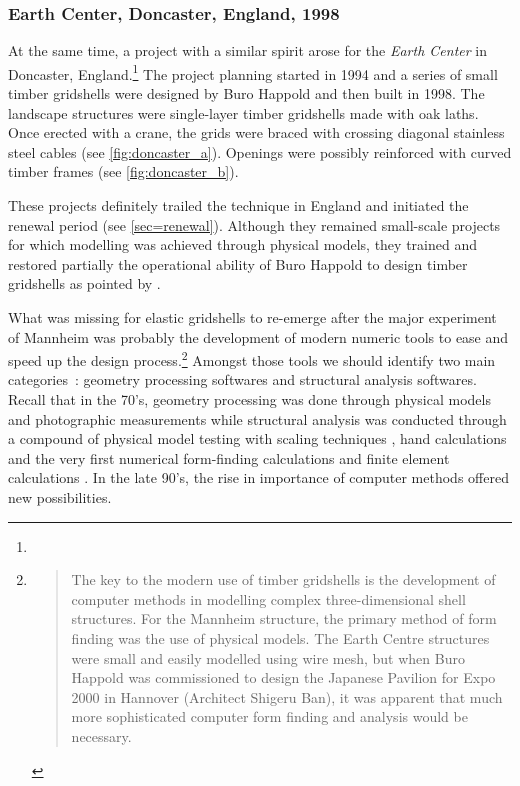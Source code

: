 \subsubsection{Earth Center, Doncaster, England, 1998}
At the same time, a project with a similar spirit arose for the \emph{Earth Center} in Doncaster, England.\footnote{} The project planning started in 1994 and a series of small timber gridshells were designed by Buro Happold and then built in 1998. The landscape structures were single-layer timber gridshells made with oak laths. Once erected with a crane, the grids were braced with crossing diagonal stainless steel cables (see \cref{fig:doncaster_a}). Openings were possibly reinforced with curved timber frames (see \cref{fig:doncaster_b}).

These projects definitely trailed the technique in England and initiated the renewal period (see \cref{sec=renewal}). Although they remained small-scale projects for which modelling was achieved through physical models, they trained and restored partially the operational ability of Buro Happold to design timber gridshells as pointed by \citet{Harris2003}.



What was missing for elastic gridshells to re-emerge after the major experiment of Mannheim was probably the development of modern numeric tools to ease and speed up the design process.\footnote{\blockcquote[]{Harris2003}{The key to the modern use of timber gridshells is the development of computer methods in modelling complex three-dimensional shell structures. For the Mannheim structure, the primary method of form finding was the use of physical models. The Earth Centre structures were small and easily modelled using wire mesh, but when Buro Happold was commissioned to design the Japanese Pavilion for Expo 2000 in Hannover (Architect Shigeru Ban), it was apparent that much more sophisticated computer form finding and analysis would be necessary.}} Amongst those tools we should identify two main categories~: geometry processing softwares and structural analysis softwares. Recall that in the 70's, geometry processing was done through physical models and photographic measurements \cite[pp.~130-135]{IL10} while structural analysis was conducted through a compound of physical model testing with scaling techniques \cite[pp.~130-135]{IL13}, hand calculations and the very first numerical form-finding calculations \cite[pp.~184-193]{IL10} and finite element calculations \cite[pp.~210-217]{IL10}. In the late 90's, the rise in importance of computer methods offered new possibilities.

